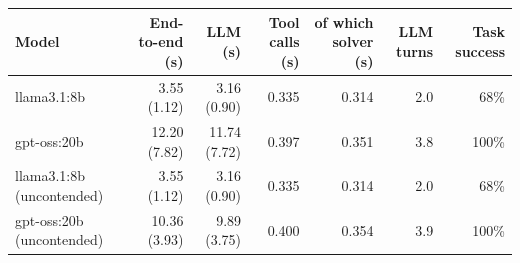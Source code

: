 \begin{tabular}{@{}lrrrrrr@{}}
\toprule
Model & End-to-end (s) & LLM (s) & Tool calls (s) & of which solver (s) & LLM turns & Task success \\
\midrule
llama3.1:8b & 3.55 (1.12) & 3.16 (0.90) & 0.335 & 0.314 & 2.0 & 68\% \\
gpt-oss:20b & 12.20 (7.82) & 11.74 (7.72) & 0.397 & 0.351 & 3.8 & 100\% \\
llama3.1:8b (uncontended) & 3.55 (1.12) & 3.16 (0.90) & 0.335 & 0.314 & 2.0 & 68\% \\
gpt-oss:20b (uncontended) & 10.36 (3.93) & 9.89 (3.75) & 0.400 & 0.354 & 3.9 & 100\% \\
\bottomrule
\end{tabular}
